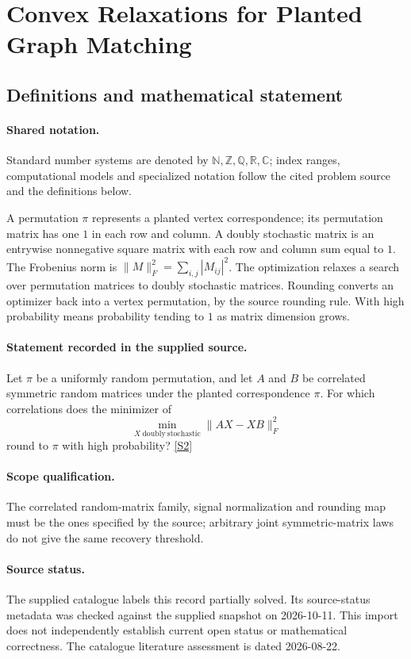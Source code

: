 \documentclass[11pt]{article}
\newcommand{\sref}[2]{\hyperlink{source:#1:#2}{[S#2]}}
\begin{document}
\section{Convex Relaxations for Planted Graph Matching}\label{statement}

\subsection{Definitions and mathematical statement}

\paragraph{Shared notation.}Standard number systems are denoted by $\mathbb N,\mathbb Z,\mathbb Q,\mathbb R,\mathbb C$; index ranges, computational models and specialized notation follow the cited problem source and the definitions below.


A permutation $\pi$ represents a planted vertex correspondence; its permutation matrix has one $1$ in each row and column. A doubly stochastic matrix is an entrywise nonnegative square matrix with each row and column sum equal to $1$. The Frobenius norm is $\lVert M\rVert_F^2=\sum_{i,j}|M_{ij}|^2$. The optimization relaxes a search over permutation matrices to doubly stochastic matrices. Rounding converts an optimizer back into a vertex permutation, by the source rounding rule. With high probability means probability tending to $1$ as matrix dimension grows.
\paragraph{Statement recorded in the supplied source.}
Let $\pi$ be a uniformly random permutation, and let $A$ and $B$ be correlated symmetric random matrices under the planted correspondence $\pi$. For which correlations does the minimizer of
$$
\min_{X\ \mathrm{doubly\ stochastic}}\|AX-XB\|_F^2
$$
round to $\pi$ with high probability? \sref{statement}{2}
\paragraph{Scope qualification.}
The correlated random-matrix family, signal normalization and rounding map must be the ones specified by the source; arbitrary joint symmetric-matrix laws do not give the same recovery threshold.
\paragraph{Source status.}
The supplied catalogue labels this record partially solved. Its source-status metadata was checked against the supplied snapshot on 2026-10-11. This import does not independently establish current open status or mathematical correctness. The catalogue literature assessment is dated 2026-08-22.
\end{document}
